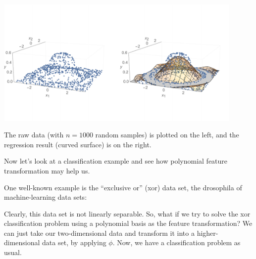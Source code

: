 \centerline{\includegraphics[width=0.9\textwidth]{figures/regression_features2_fitsombrero.pdf}}

\noindent
The raw data (with $n=1000$ random samples) is plotted on the left, and the regression result (curved surface) is on the right.


Now let's look at a classification example and see how polynomial feature transformation may help us.

One well-known example is the ``exclusive or'' ({\sc xor}) data set, the drosophila  of machine-learning data sets:

\begin{examplebox}
  \begin{center}
  \end{center}
\end{examplebox}

Clearly, this data set is not linearly separable. So, what if we try to solve the {\sc xor} classification problem using a polynomial
basis as the feature transformation?  We can just take our
two-dimensional data and transform it into a higher-dimensional data
set, by applying $\phi$.  Now, we have a classification problem as
usual.

